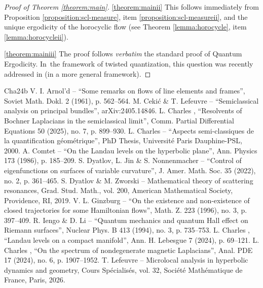 \documentclass[10pt,a4paper]{amsart}
\theoremstyle{plain}
\theoremstyle{definition}
\begin{document}
\begin{proof}[Proof of Theorem \ref{theorem:main}]
\smallskip

\eqref{theorem:mainii}
This follows immediately from Proposition \ref{proposition:scl-measure}, item \eqref{proposition:scl-measureii}, and the unique ergodicity of the horocyclic flow (see Theorem \ref{lemma:horocycle}, item \eqref{lemma:horocycleii}).

\smallskip

\eqref{theorem:mainiii}
The proof follows \emph{verbatim} the standard proof of Quantum Ergodicity. In~the framework of twisted quantization, this question was recently addressed in \cite[\S 5.3]{Cekic-Lefeuvre-24} (in a more general framework).
\end{proof}

\begin{thebibliography}{Cha24b}
 V. I. Arnol’d – “Some remarks on flows of line elements and frames”, Soviet Math. Dokl. 2 (1961), p. 562–564.
 M. Cekić \& T. Lefeuvre – “Semiclassical analysis on principal bundles”, arXiv:2405.14846.
 L. Charles , “Resolvents of Bochner Laplacians in the semiclassical limit”, Comm. Partial Differential Equations 50 (2025), no. 7, p. 899–930.
 L. Charles – “Aspects semi-classiques de la quantification géométrique”, PhD Thesis, Université Paris Dauphine-PSL, 2000.
 A. Comtet – “On the Landau levels on the hyperbolic plane”, Ann. Physics 173 (1986), p. 185–209.
 S. Dyatlov, L. Jin \& S. Nonnenmacher – “Control of eigenfunctions on surfaces of variable curvature”, J. Amer. Math. Soc. 35 (2022), no. 2, p. 361–465.
 S. Dyatlov \& M. Zworski – Mathematical theory of scattering resonances, Grad. Stud. Math., vol. 200, American Mathematical Society, Providence, RI, 2019.
 V. L. Ginzburg – “On the existence and non-existence of closed trajectories for some Hamiltonian flows”, Math. Z. 223 (1996), no. 3, p. 397–409.
 R. Iengo \& D. Li – “Quantum mechanics and quantum Hall effect on Riemann surfaces”, Nuclear Phys. B 413 (1994), no. 3, p. 735–753.
 L. Charles , “Landau levels on a compact manifold”, Ann. H. Lebesgue 7 (2024), p. 69–121.
 L. Charles , “On the spectrum of nondegenerate magnetic Laplacians”, Anal. PDE 17 (2024), no. 6, p. 1907–1952.
 T. Lefeuvre – Microlocal analysis in hyperbolic dynamics and geometry, Cours Spécialisés, vol. 32, Société Mathématique de France, Paris, 2026.

\end{thebibliography}
\end{document}
